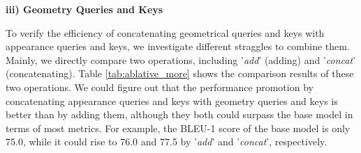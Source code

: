 \documentclass[review]{elsarticle}
\begin{document}
\begin{table}[tb]
\LARGE
  \begin{center}
    \caption{The comparison results of different component combination strategies, including geometry Queries and Keys, and the GLU module in the Transformer structure.}
    \label{tab:ablative_more}
  \end{center}
\end{table}

\textbf{iii) Geometry Queries and Keys}

To verify the efficiency of concatenating geometrical queries and keys with appearance queries and keys, we investigate different straggles to combine them. Mainly, we directly compare two operations, including '\emph{add}' (adding) and '\emph{concat}' (concatenating). Table \ref{tab:ablative_more} shows the comparison results of these two operations. We could figure out that the performance promotion by concatenating appearance queries and keys with geometry queries and keys is better than by adding them, although they both could surpass the base model in terms of most metrics. For example, the BLEU-1 score of the base model is only 75.0, while it could rise to 76.0 and 77.5 by '\emph{add}' and '\emph{concat}', respectively.
\end{document}
